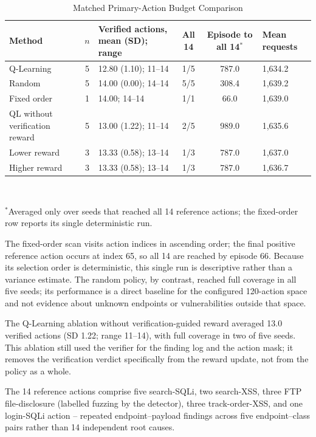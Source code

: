 \documentclass[conference, a4paper]{IEEEtran}
\begin{document}
\begin{table}[!t]
\caption{Matched Primary-Action Budget Comparison}
\label{tab:strategy-results}
\centering
\scriptsize
\begin{tabular}{p{}c p{}c c p{}}
\toprule
\textbf{Method} & \textbf{$n$} & \textbf{Verified actions, mean (SD); range} & \textbf{All 14} & \textbf{Episode to all 14$^*$} & \textbf{Mean requests}\\
\midrule
Q-Learning & 5 & 12.80 (1.10); 11--14 & 1/5 & 787.0 & 1,634.2\\
Random & 5 & 14.00 (0.00); 14--14 & 5/5 & 308.4 & 1,639.2\\
Fixed order & 1 & 14.00; 14--14 & 1/1 & 66.0 & 1,639.0\\
QL without verification reward & 5 & 13.00 (1.22); 11--14 & 2/5 & 989.0 & 1,635.6\\
Lower reward & 3 & 13.33 (0.58); 13--14 & 1/3 & 787.0 & 1,637.0\\
Higher reward & 3 & 13.33 (0.58); 13--14 & 1/3 & 787.0 & 1,636.7\\
\bottomrule
\end{tabular}
\\[2pt]
\raggedright\scriptsize $^*$Averaged only over seeds that reached all 14 reference actions; the fixed-order row reports its single deterministic run.
\end{table}

The fixed-order scan visits action indices in ascending order; the
final positive reference action occurs at index 65, so all 14 are
reached by episode 66. Because its selection order is deterministic,
this single run is descriptive rather than a variance estimate. The
random policy, by contrast, reached full coverage in all five
seeds; its performance is a direct baseline for the configured
120-action space and not evidence about unknown endpoints or
vulnerabilities outside that space.

The Q-Learning ablation without verification-guided reward averaged
13.0 verified actions (SD 1.22; range 11--14), with full coverage
in two of five seeds. This ablation still used the verifier for the
finding log and the action mask; it removes the verification
verdict specifically from the reward update, not from the policy as
a whole.

The 14 reference actions comprise five search-SQLi, two
search-XSS, three FTP file-disclosure (labelled fuzzing by the
detector), three track-order-XSS, and one login-SQLi action --
repeated endpoint--payload findings across five endpoint--class
pairs rather than 14 independent root causes.
\end{document}
